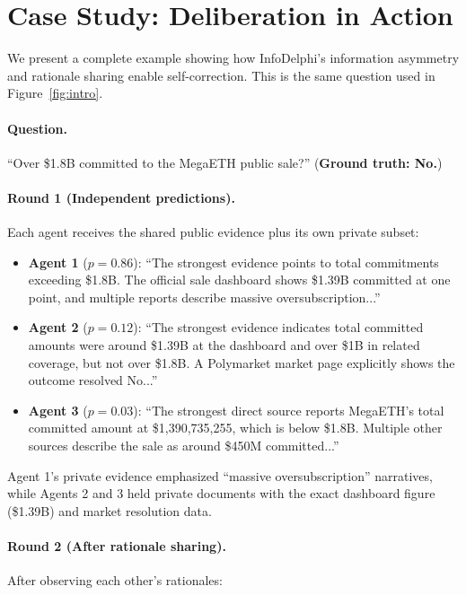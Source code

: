 \documentclass[11pt]{article}
\theoremstyle{plain}
\theoremstyle{definition}
\begin{document}
\section{Case Study: Deliberation in Action}
\label{sec:appendix_case}

We present a complete example showing how InfoDelphi's information asymmetry and rationale sharing enable self-correction. This is the same question used in Figure~\ref{fig:intro}.

\paragraph{Question.} ``Over \$1.8B committed to the MegaETH public sale?'' (\textbf{Ground truth: No.})

\paragraph{Round 1 (Independent predictions).}
Each agent receives the shared public evidence plus its own private subset:

\begin{itemize}[nosep,leftmargin=15pt]
\item \textbf{Agent 1} ($p = 0.86$): ``The strongest evidence points to total commitments exceeding \$1.8B. The official sale dashboard shows \$1.39B committed at one point, and multiple reports describe massive oversubscription...''
\item \textbf{Agent 2} ($p = 0.12$): ``The strongest evidence indicates total committed amounts were around \$1.39B at the dashboard and over \$1B in related coverage, but not over \$1.8B. A Polymarket market page explicitly shows the outcome resolved No...''
\item \textbf{Agent 3} ($p = 0.03$): ``The strongest direct source reports MegaETH's total committed amount at \$1,390,735,255, which is below \$1.8B. Multiple other sources describe the sale as around \$450M committed...''
\end{itemize}

Agent 1's private evidence emphasized ``massive oversubscription'' narratives, while Agents 2 and 3 held private documents with the exact dashboard figure (\$1.39B) and market resolution data.

\paragraph{Round 2 (After rationale sharing).}
After observing each other's rationales:
\end{document}
